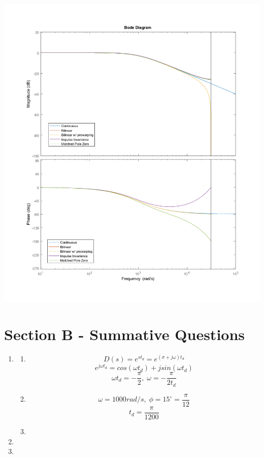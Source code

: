\documentclass[11pt]{article}
\begin{document}
\begin{preview}
\begin{enumerate}
\begin{center}
        \includegraphics[height=0.3\textwidth]{fig/3_bode.png}
    \end{center}
\end{enumerate}

\section*{Section B - Summative Questions}
\begin{enumerate}
    \item 
    \begin{enumerate}
        \item $$D(s)=e^{st_{d}} = e^{(\sigma+j\omega)t_{d}}$$
        $$e^{j\omega t_d} = cos(\omega t_d) + jsin(\omega t_d)$$
        $$\omega t_d = -\frac{\pi}{2},\; \omega = -\frac{\pi}{2t_d}$$
        \item $$\omega = 1000 rad/s, \; \phi=15^{\circ} = \frac{\pi}{12}$$
        $$t_d = \frac{\pi}{1200}$$
        \item 
    \end{enumerate}
    \item 
    \item 
\end{enumerate}
\end{preview}
\end{document}
